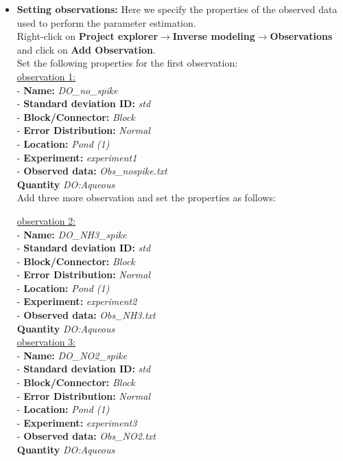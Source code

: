 \begin{itemize}
\item \textbf{Setting observations: } Here we specify the properties of the observed data used to perform the parameter estimation. \\ Right-click on \textbf{Project explorer}$\rightarrow$\textbf{Inverse modeling}$\rightarrow$\textbf{Observations} and click on \textbf{Add Observation}.\\ 
Set the following properties for the first observation: \\
\underline{observation 1:} \\
- \textbf{Name: } \textit{DO\_no\_spike}\\
- \textbf{Standard deviation ID: } \textit{std} \\
- \textbf{Block/Connector: } \textit{Block} \\
- \textbf{Error Distribution: } \textit{Normal} \\
- \textbf{Location: } \textit{Pond (1)} \\
- \textbf{Experiment: } \textit{experiment1} \\
- \textbf{Observed data: }  \textit{Obs\_nospike.txt} \\
\textbf{Quantity} \textit{DO:Aqueous} \\

Add three more observation and set the properties as follows: 

\underline{observation 2:} \\
- \textbf{Name: } \textit{DO\_NH3\_spike}\\
- \textbf{Standard deviation ID: } \textit{std} \\
- \textbf{Block/Connector: } \textit{Block} \\
- \textbf{Error Distribution: } \textit{Normal} \\
- \textbf{Location: } \textit{Pond (1)} \\
- \textbf{Experiment: } \textit{experiment2} \\
- \textbf{Observed data: }  \textit{Obs\_NH3.txt} \\
\textbf{Quantity} \textit{DO:Aqueous} \\

\underline{observation 3:} \\
- \textbf{Name: } \textit{DO\_NO2\_spike}\\
- \textbf{Standard deviation ID: } \textit{std} \\
- \textbf{Block/Connector: } \textit{Block} \\
- \textbf{Error Distribution: } \textit{Normal} \\
- \textbf{Location: } \textit{Pond (1)} \\
- \textbf{Experiment: } \textit{experiment3} \\
- \textbf{Observed data: }  \textit{Obs\_NO2.txt} \\
\textbf{Quantity} \textit{DO:Aqueous} \\


\end{itemize}
